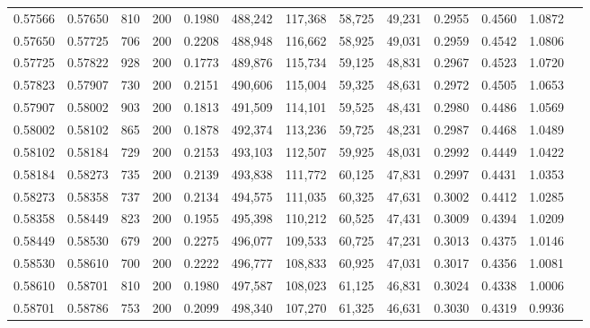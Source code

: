 \begin{tabular}{rrrrrrrrrrrrr}
0.57566 & 0.57650 &   810 & 200 &                                     0.1980 & 488,242 & 117,368 &  58,725 &  49,231 & 0.2955 & 0.4560 & 1.0872 \\
0.57650 & 0.57725 &   706 & 200 &                                     0.2208 & 488,948 & 116,662 &  58,925 &  49,031 & 0.2959 & 0.4542 & 1.0806 \\
0.57725 & 0.57822 &   928 & 200 &                                     0.1773 & 489,876 & 115,734 &  59,125 &  48,831 & 0.2967 & 0.4523 & 1.0720 \\
0.57823 & 0.57907 &   730 & 200 &                                     0.2151 & 490,606 & 115,004 &  59,325 &  48,631 & 0.2972 & 0.4505 & 1.0653 \\
0.57907 & 0.58002 &   903 & 200 &                                     0.1813 & 491,509 & 114,101 &  59,525 &  48,431 & 0.2980 & 0.4486 & 1.0569 \\
0.58002 & 0.58102 &   865 & 200 &                                     0.1878 & 492,374 & 113,236 &  59,725 &  48,231 & 0.2987 & 0.4468 & 1.0489 \\
0.58102 & 0.58184 &   729 & 200 &                                     0.2153 & 493,103 & 112,507 &  59,925 &  48,031 & 0.2992 & 0.4449 & 1.0422 \\
0.58184 & 0.58273 &   735 & 200 &                                     0.2139 & 493,838 & 111,772 &  60,125 &  47,831 & 0.2997 & 0.4431 & 1.0353 \\
0.58273 & 0.58358 &   737 & 200 &                                     0.2134 & 494,575 & 111,035 &  60,325 &  47,631 & 0.3002 & 0.4412 & 1.0285 \\
0.58358 & 0.58449 &   823 & 200 &                                     0.1955 & 495,398 & 110,212 &  60,525 &  47,431 & 0.3009 & 0.4394 & 1.0209 \\
0.58449 & 0.58530 &   679 & 200 &                                     0.2275 & 496,077 & 109,533 &  60,725 &  47,231 & 0.3013 & 0.4375 & 1.0146 \\
0.58530 & 0.58610 &   700 & 200 &                                     0.2222 & 496,777 & 108,833 &  60,925 &  47,031 & 0.3017 & 0.4356 & 1.0081 \\
0.58610 & 0.58701 &   810 & 200 &                                     0.1980 & 497,587 & 108,023 &  61,125 &  46,831 & 0.3024 & 0.4338 & 1.0006 \\
0.58701 & 0.58786 &   753 & 200 &                                     0.2099 & 498,340 & 107,270 &  61,325 &  46,631 & 0.3030 & 0.4319 & 0.9936 \\

\end{tabular}
